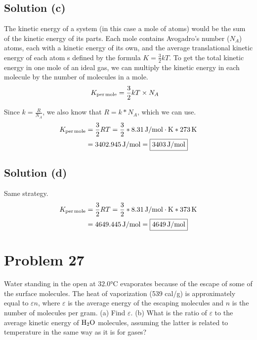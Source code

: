 \documentclass[12pt]{article}
\begin{document}
        \subsection{Solution (c)}
            The kinetic energy of a system (in this case a mole of atoms) would be the sum of the kinetic energy of its parts.
            Each mole contains Avogadro's number ($N_A$) atoms, each with a kinetic energy of its own, and the average translational kinetic energy of each atom s defined by the formula $K = \frac{3}{2}kT$.
            To get the total kinetic energy in one mole of an ideal gas, we can multiply the kinetic energy in each molecule by the number of molecules in a mole.
            \begin{align}
                K_{\rm per\,mole}    &=  \frac{3}{2}kT \times N_A
            \end{align}

            Since $k = \frac{R}{N_A}$, we also know that $R = k * N_A$, which we can use.
            \begin{align}
                K_{\rm per\,mole}    &=  \frac{3}{2}RT
                    =   \frac{3}{2} * 8.31\,\unit{\joule/\mole\cdot\kelvin} * 273\,\unit{\kelvin}\\
                    &=  3402.945\,\unit{\joule/\mole}
                    =   \boxed{3403\,\unit{\joule/\mole}}
            \end{align}

        \subsection{Solution (d)}
            Same strategy.
            \begin{align}
                K_{\rm per\,mole}    &=  \frac{3}{2}RT
                    =   \frac{3}{2} * 8.31\,\unit{\joule/\mole\cdot\kelvin} * 373\,\unit{\kelvin}\\
                    &=  4649.445\,\unit{\joule/\mole}
                    =   \boxed{4649\,\unit{\joule/\mole}}
            \end{align}

    \pagebreak
    \section{Problem 27}
        Water standing in the open at $32.0\unit{\celsius}$ evaporates because of the escape of some of the surface molecules. 
        The heat of vaporization (539 cal/g) is approximately equal to $\varepsilon n$, where $\varepsilon$ is the average energy of the escaping molecules and $n$ is the number of molecules per gram. 
        (a) Find $\varepsilon$. 
        (b) What is the ratio of $\varepsilon$ to the average kinetic energy of $\rm H_2O$ molecules, assuming the latter is related to temperature in the same way as it is for gases?
\end{document}
